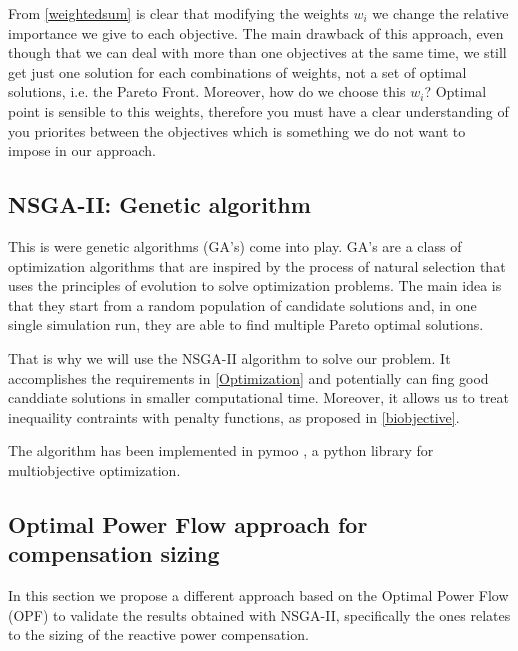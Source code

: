 \documentclass[a4paper,11pt, titlepage, twoside]{article}
\begin{document}
From \ref{weightedsum} is clear that modifying the weights $w_i$ we change the relative importance we give to each objective. The main drawback of this approach, even though that we can deal with more than one objectives at the same time, we
still get just one solution for each combinations of weights, not a set of optimal solutions, i.e. the Pareto Front. Moreover, how do we choose this $w_i$? Optimal point is sensible to this weights, therefore you must have
a clear understanding of you priorites between the objectives which is something we do not want to impose in our approach.\par

\subsection{NSGA-II: Genetic algorithm}\label{NSGAII}



This is were genetic algorithms (GA's) come into play. GA's are a class of optimization algorithms that are inspired by the process of natural selection that uses the principles of evolution to solve optimization problems. The main idea is that they start from a random
population of candidate solutions and, in one single simulation run, they are able to find multiple Pareto optimal solutions. \par

That is why we will use the NSGA-II algorithm \cite{NSGAII} to solve our problem. It accomplishes the requirements in \ref{Optimization} and potentially
can fing good canddiate solutions in smaller computational time. Moreover, it allows us to treat inequaility contraints with penalty functions, as proposed in \ref{biobjective}.\par



The algorithm has been implemented in pymoo \cite{pymoo}, a python library for multiobjective optimization.




\subsection{Optimal Power Flow approach for compensation sizing}

In this section we propose a different approach based on the Optimal Power Flow (OPF) to validate the results obtained with NSGA-II, specifically the ones relates to
the sizing of the reactive power compensation.\par 
\end{document}
